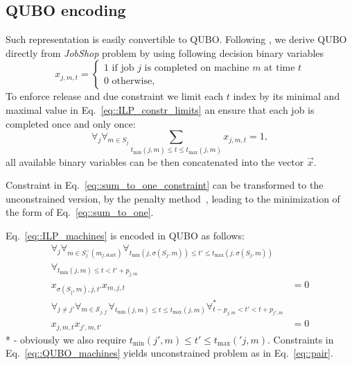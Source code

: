 \documentclass[aps,pra,amsmath,amssymb,amsfonts,lengthcheck,twocolumn,superscriptaddress]{revtex4-1}
\begin{document}
\subsection{QUBO encoding}

Such representation is easily convertible to QUBO.
Following \cite{venturelli2016job}, we derive QUBO directly from \emph{JobShop} problem by using following decision binary variables 
\begin{equation}
    x_{j,m,t} = \begin{cases} 1 \text{ if job } j \text{ is completed on machine } m \text{ at time } t \\
    0 \text{ otherwise},
    \end{cases}
\end{equation}
To enforce release and due constraint we limit each $t$ index by its minimal and maximal value in Eq.~\eqref{eq::ILP_constr_limits}
an ensure that each job is completed once and only once:
\begin{equation}\label{eq::sum_to_one_constraint}
  \forall_j \forall_{m \in S_j} \sum_{t_{\text{min}}(j,m) \leq t \leq t_{\text{max}}(j,m)} x_{j,m,t} = 1,
\end{equation}
all available binary variables can be then concatenated into the vector $\vec{x}$.

Constraint in Eq.~\eqref{eq::sum_to_one_constraint} can be transformed to the unconstrained version, by the penalty method~\cite{gusmeroli2022expedis}, leading to the minimization of the form of Eq.~\eqref{eq::sum_to_one}.

Eq.~\eqref{eq::ILP_machines} is encoded in QUBO as follows:
\begin{equation}
    \begin{split}
      \forall_{j} \forall_{m \in S_j^- (m_{j, \text{start}}) }  \forall_{t_{\text{min}}(j,\sigma(S_j, m)) \leq t' \leq t_{\text{max}}(j,\sigma(S_j, m))} &\\ \forall_{t_{\text{min}}(j,m) \leq t < t' + p_{j,m} } &\\  x_{\sigma(S_j, m),j,t'} x_{m, j, t} &= 0 \\
     \forall_{j \neq j'} \forall_{m \in \mathcal{S}_{j,j'}} \forall_{t_{\text{min}}(j,m) \leq t \leq t_{\text{max}}(j,m)}  \forall^*_{t - p_{j,m} < t' < t + p_{j',m}} &\\  x_{j,m,t} x_{j', m, t'} &= 0
    \end{split}
    \label{eq::QUBO_machines}
\end{equation}
* - obviously we also require $t_{\text{min}}(j',m) \leq t' \leq t_{\text{max}}('j,m)$.
Constraints in Eq.~\eqref{eq::QUBO_machines} yields unconstrained problem as in Eq.~\eqref{eq::pair}.
\end{document}

